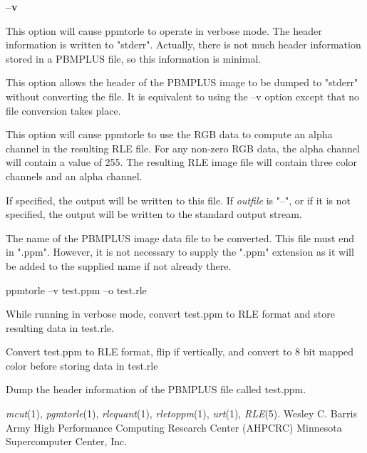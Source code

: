 \begin{TPlist}{{\bf --v}}
\item[{{\bf --v}}]
This option will cause ppmtorle to operate in verbose mode.  The header
information is written to "stderr".  Actually, there is not much header
information stored in a PBMPLUS file, so this information is minimal.
\item[{{\bf --h}}]
This option allows the header of the PBMPLUS image to be dumped to "stderr"
without converting the file.  It is equivalent to using the --v option except
that no file conversion takes place.
\item[{{\bf --m}}]
This option will cause ppmtorle to use the RGB data to compute an alpha
channel in the resulting RLE file.  For any non-zero RGB data, the alpha
channel will contain a value of 255.  The resulting RLE image file will
contain three color channels and an alpha channel.
\item[{{\bf --o}{\it \ outfile}
}]
If specified, the output will be written to this file.  If 
{\it outfile}
is "--", or if it is not specified, the output will be written to the
standard output stream.
\item[{{\it infile.ppm}}]
The name of the PBMPLUS image data file to be converted.  This file must end
in ".ppm".  However, it is not necessary to supply the ".ppm" extension as it
will be added to the supplied name if not already there.
\end{TPlist}
\begin{TPlist}{ppmtorle --v test.ppm --o test.rle}
\item[{ppmtorle --v test.ppm --o test.rle}]
While running in verbose mode, convert test.ppm to RLE format and store
resulting data in test.rle.
\item[{ppmtorle test $|$ rleflip --v $|$ mcut $>$test.rle}]
Convert test.ppm to RLE format, flip if vertically, and convert to 8 bit
mapped color before storing data in test.rle
\item[{ppmtorle --h test}]
Dump the header information of the PBMPLUS file called test.ppm.
\end{TPlist}
{\it mcut}{\rm (1),}
{\it pgmtorle}{\rm (1),}
{\it rlequant}{\rm (1),}
{\it rletoppm}{\rm (1),}
{\it urt}{\rm (1),}
{\it RLE}{\rm (5).}
\nwl
Wesley C. Barris
\nwl
Army High Performance Computing Research Center (AHPCRC)
\nwl
Minnesota Supercomputer Center, Inc.
\newpage


